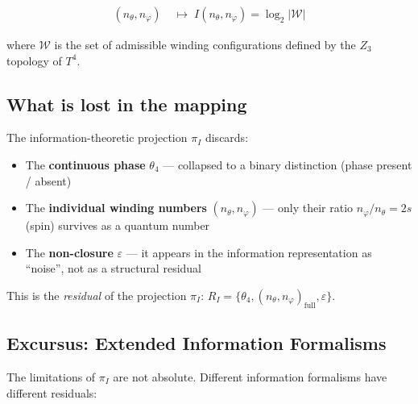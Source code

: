 \begin{align}
  (n_\theta, n_\varphi) &\;\longmapsto\; I(n_\theta, n_\varphi)
  = \log_2 |\mathcal{W}| \tag{243.3}
\end{align}

where $\mathcal{W}$ is the set of admissible winding configurations
defined by the $Z_3$ topology of $T^4$.

\subsection{What is lost in the mapping}

The information-theoretic projection $\pi_I$ discards:

\begin{itemize}
  \item The \textbf{continuous phase} $\theta_4$ --- collapsed to a
        binary distinction (phase present / absent)
  \item The \textbf{individual winding numbers} $(n_\theta, n_\varphi)$
        --- only their ratio $n_\varphi / n_\theta = 2s$ (spin)
        survives as a quantum number
  \item The \textbf{non-closure} $\varepsilon$ --- it appears in the
        information representation as ``noise'', not as a structural residual
\end{itemize}

This is the \emph{residual} of the projection $\pi_I$:
$R_I = \{\theta_4, (n_\theta, n_\varphi)_\text{full}, \varepsilon\}$.


\subsection{Excursus: Extended Information Formalisms}

The limitations of $\pi_I$ are not absolute. Different information
formalisms have different residuals:

\begin{center}
\renewcommand{\arraystretch}{1.3}
{\footnotesize
{}
}
\end{center}

